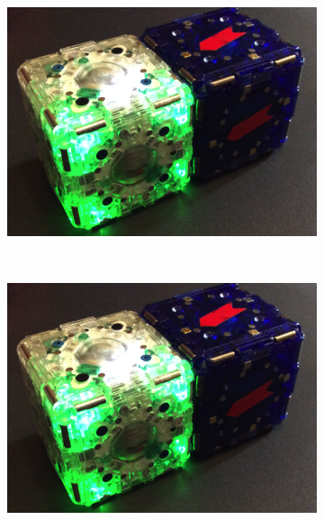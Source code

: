 \begin{figure}[t]
	\centering
	\begin{subfigure}[b]{1.75 in}
			\includegraphics[width=.9\linewidth]{Figures/mTagsCover.png}
	\end{subfigure}
	~
	\begin{subfigure}[b]{1.5 in}


		\resizebox{1.5 in}{1.25 in}
		{
			\begin{tikzpicture}[x=(220:1cm), y=(-40:1cm), z=(90:0.707cm)]
			
			
			
			\end{tikzpicture}
		}

	\end{subfigure}

		\begin{subfigure}[b]{1.75 in}
		\includegraphics[width=.9\linewidth]{Figures/mTagsCover.png}
	\end{subfigure}
	~
	\begin{subfigure}[b]{1.5 in}
		

\end{subfigure}
\end{figure}
